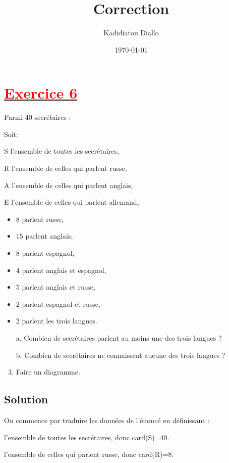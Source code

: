 \documentclass[12pt]{article}
\author{Kadidiatou Diallo}
\title{\textbf{Correction}}
\date{\today}
\begin{document}
\maketitle
\newpage

\section*{\underline{\textbf{\textcolor{red}{Exercice 6}}}} 

Parmi $40$ secrétaires : 

Soit:

S l'ensemble  de toutes les secrétaires,

R l'ensemble  de celles qui parlent russe, 

A l'ensemble  de celles qui parlent anglais,

E l'ensemble  de celles qui parlent allemand,

\begin{itemize}
    \item $8$ parlent russe,
    \item $15$ parlent anglais,
    \item $8$ parlent espagnol,
    \item $4$ parlent anglais et espagnol,
    \item $5$ parlent anglais et russe,
    \item $2$ parlent espagnol et russe,
    \item $2$ parlent les trois langues.
\end{itemize}

\begin{enumerate}
    \item[a.] Combien de secrétaires parlent au moins une des trois langues ?
    
    \item[b.] Combien de secrétaires ne connaissent aucune des trois langues ?
    
    \item Faire un diagramme.
\end{enumerate}

\subsection*{Solution}
On commence par traduire les données de l'énoncé en définissant : 
 
l'ensemble  de toutes les secrétaires, donc  card(S)=40.

l'ensemble  de celles qui parlent russe, donc  card(R)=8.
\end{document}
